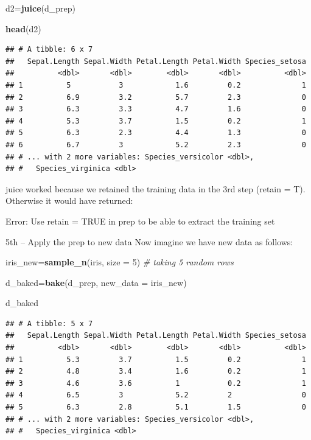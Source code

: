 \documentclass[]{article}
\newenvironment{Shaded}{\begin{snugshade}}{\end{snugshade}}
\newcommand{\KeywordTok}[1]{\textcolor[rgb]{0.13,0.29,0.53}{\textbf{#1}}}
\newcommand{\DataTypeTok}[1]{\textcolor[rgb]{0.13,0.29,0.53}{#1}}
\newcommand{\DecValTok}[1]{\textcolor[rgb]{0.00,0.00,0.81}{#1}}
\newcommand{\CommentTok}[1]{\textcolor[rgb]{0.56,0.35,0.01}{\textit{#1}}}
\newcommand{\NormalTok}[1]{#1}
\begin{document}
\begin{Shaded}
\begin{Highlighting}[]
\NormalTok{d2=}\KeywordTok{juice}\NormalTok{(d_prep)}

\KeywordTok{head}\NormalTok{(d2)}
\end{Highlighting}
\end{Shaded}

\begin{verbatim}
## # A tibble: 6 x 7
##   Sepal.Length Sepal.Width Petal.Length Petal.Width Species_setosa
##          <dbl>       <dbl>        <dbl>       <dbl>          <dbl>
## 1          5           3            1.6         0.2              1
## 2          6.9         3.2          5.7         2.3              0
## 3          6.3         3.3          4.7         1.6              0
## 4          5.3         3.7          1.5         0.2              1
## 5          6.3         2.3          4.4         1.3              0
## 6          6.7         3            5.2         2.3              0
## # ... with 2 more variables: Species_versicolor <dbl>,
## #   Species_virginica <dbl>
\end{verbatim}

juice worked because we retained the training data in the 3rd step
(retain = T). Otherwise it would have returned:

Error: Use retain = TRUE in prep to be able to extract the training set

5th -- Apply the prep to new data Now imagine we have new data as
follows:

\begin{Shaded}
\begin{Highlighting}[]
\NormalTok{iris_new=}\KeywordTok{sample_n}\NormalTok{(iris, }\DataTypeTok{size =} \DecValTok{5}\NormalTok{) }\CommentTok{# taking 5 random rows}

\NormalTok{d_baked=}\KeywordTok{bake}\NormalTok{(d_prep, }\DataTypeTok{new_data =}\NormalTok{ iris_new)}

\NormalTok{d_baked}
\end{Highlighting}
\end{Shaded}

\begin{verbatim}
## # A tibble: 5 x 7
##   Sepal.Length Sepal.Width Petal.Length Petal.Width Species_setosa
##          <dbl>       <dbl>        <dbl>       <dbl>          <dbl>
## 1          5.3         3.7          1.5         0.2              1
## 2          4.8         3.4          1.6         0.2              1
## 3          4.6         3.6          1           0.2              1
## 4          6.5         3            5.2         2                0
## 5          6.3         2.8          5.1         1.5              0
## # ... with 2 more variables: Species_versicolor <dbl>,
## #   Species_virginica <dbl>
\end{verbatim}
\end{document}
